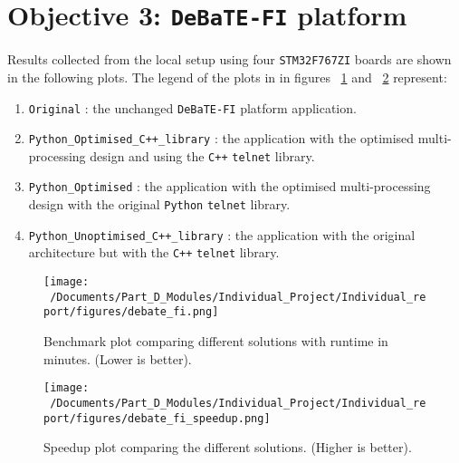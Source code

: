 \section{Objective 3: \texttt{DeBaTE-FI} platform}

Results collected from the local setup using four \texttt{STM32F767ZI} boards are shown in the following plots. The legend of the plots in in figures ~\ref{fig:debate_fi_plot} and ~\ref{fig:debate_fi_speedup} represent:

\begin{enumerate}
	\item \texttt{Original} : the unchanged \texttt{DeBaTE-FI} platform application. 
	\item \texttt{Python\_Optimised\_C++\_library} : the application with the optimised multi-processing design and using the \texttt{C++} \texttt{telnet} library.
	\item \texttt{Python\_Optimised} : the application with the optimised multi-processing design with the original \texttt{Python} \texttt{telnet} library.
	\item \texttt{Python\_Unoptimised\_C++\_library} : the application with the original architecture but with the \texttt{C++} \texttt{telnet} library.
\end{enumerate}

\begin{figure}[htbp] %
	\centering
	\texttt{[image: ~/Documents/Part\_D\_Modules/Individual\_Project/Individual\_report/figures/debate\_fi.png]} %
	\caption{Benchmark plot comparing different solutions with runtime in minutes. (Lower is better).}
	\label{fig:debate_fi_plot} %
\end{figure}

\begin{figure}[htbp] %
	\centering
	\texttt{[image: ~/Documents/Part\_D\_Modules/Individual\_Project/Individual\_report/figures/debate\_fi\_speedup.png]} %
	\caption{Speedup plot comparing the different solutions. (Higher is better).}
	\label{fig:debate_fi_speedup} %
\end{figure}

